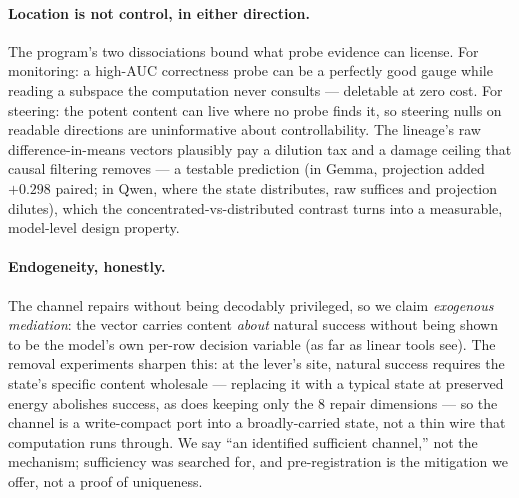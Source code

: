 \documentclass{article} %
\begin{document}
\paragraph{Location is not control, in either direction.} The program's
two dissociations bound what probe evidence can license. For
monitoring: a high-AUC correctness probe can be a perfectly good gauge
while reading a subspace the computation never consults --- deletable
at zero cost. For steering: the potent content can live where no probe
finds it, so steering nulls on readable directions are uninformative
about controllability. The lineage's raw difference-in-means vectors
plausibly pay a dilution tax and a damage ceiling that causal filtering
removes --- a testable prediction (in Gemma, projection added $+0.298$
paired;
in Qwen, where the state distributes, raw suffices and projection
dilutes), which the concentrated-vs-distributed contrast turns into a
measurable, model-level design property.

\paragraph{Endogeneity, honestly.} The channel repairs without being
decodably privileged, so we claim \emph{exogenous mediation}: the
vector carries content \emph{about} natural success without being shown
to be the model's own per-row decision variable (as far as linear tools
see). The removal experiments sharpen this: at the lever's site,
natural success requires the state's specific content wholesale ---
replacing it with a typical state at preserved energy abolishes
success, as does keeping only the 8 repair dimensions --- so the
channel is a write-compact port into a broadly-carried state, not a
thin wire that computation runs through. We say ``an identified
sufficient channel,'' not the mechanism; sufficiency was searched for,
and pre-registration is the mitigation we offer, not a proof of
uniqueness.
\end{document}
